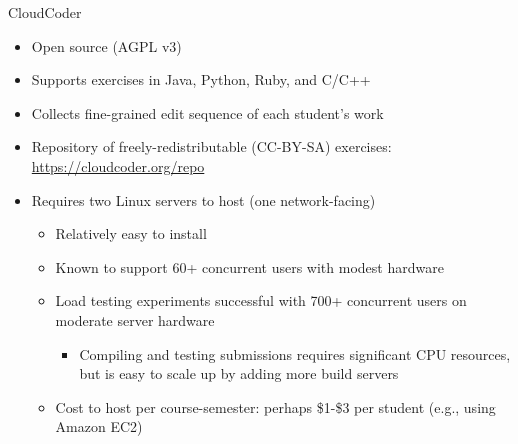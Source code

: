 \documentclass{beamer}
\begin{document}
\begin{frame}{CloudCoder}

\begin{itemize}
  \item Open source (AGPL v3)
  \item Supports exercises in Java, Python, Ruby, and C/C++
  \item Collects fine-grained edit sequence of each student's work
  \item Repository of freely-redistributable (CC-BY-SA) exercises:
        \url{https://cloudcoder.org/repo}
  \item Requires two Linux servers to host (one network-facing)
    \begin{itemize}
    \item Relatively easy to install
    \item Known to support 60+ concurrent users with modest hardware
    \item Load testing experiments successful with 700+ concurrent users
          on moderate server hardware
      \begin{itemize}
      \item Compiling and testing submissions requires significant
            CPU resources, but is easy to scale up by adding more
            build servers
      \end{itemize}
    \item Cost to host per course-semester: perhaps \$1-\$3 per student
          (e.g., using Amazon EC2)
    \end{itemize}
\end{itemize}

\end{frame}

\end{document}
